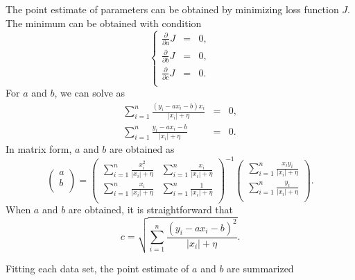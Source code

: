 \documentclass{revtex4}
\begin{document}
The point estimate of parameters can be obtained by minimizing loss function $J$.
The minimum can be obtained with condition
\begin{equation}
  \left\{
  \begin{array}{ccc}
    \frac{\partial}{\partial a}J & = & 0,\\
    \frac{\partial}{\partial b}J & = & 0,\\
    \frac{\partial}{\partial c}J & = & 0.\\
  \end{array}
  \right.
\end{equation}
For $a$ and $b$, we can solve as
\begin{eqnarray}
  \sum^n_{i=1}\frac{\left(y_i-ax_i-b\right)x_i}{\left|x_i\right|+\eta} &=& 0,\nonumber\\
  \sum^n_{i=1}\frac{y_i-ax_i-b}{\left|x_i\right|+\eta} &=& 0.\nonumber
\end{eqnarray}
In matrix form, $a$ and $b$ are obtained as
\begin{equation}
  \left(
  \begin{array}{c}
    a\\
    b\\
  \end{array}
  \right) = \left(
  \begin{array}{cc}
    \sum^n_{i=1}\frac{x^2_i}{\left|x_i\right|+\eta} & \sum^n_{i=1}\frac{x_i}{\left|x_i\right|+\eta}\\
    \sum^n_{i=1}\frac{x_i}{\left|x_i\right|+\eta} & \sum^n_{i=1}\frac{1}{\left|x_i\right|+\eta}\\
  \end{array}
  \right)^{-1}\left(
  \begin{array}{c}
    \sum^n_{i=1}\frac{x_iy_i}{\left|x_i\right|+\eta}\\
    \sum^n_{i=1}\frac{y_i}{\left|x_i\right|+\eta}\\
  \end{array}
  \right).
\end{equation}
When $a$ and $b$ are obtained, it is straightforward that
\begin{equation}
  c = \sqrt{\sum^n_{i=1}\frac{\left(y_i-ax_i-b\right)^2}{\left|x_i\right|+\eta}}.
\end{equation}

Fitting each data set, the point estimate of $a$ and $b$ are summarized
\end{document}
